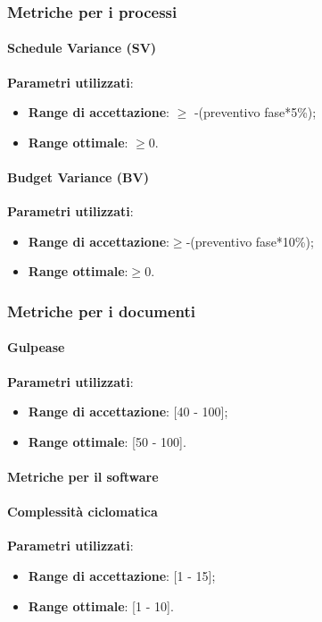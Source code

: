 \documentclass[12pt,a4paper,titlepage]{article}
\begin{document}
		\subsubsection{Metriche per i processi}
			\paragraph{Schedule Variance (SV)}
			\textbf{Parametri utilizzati}:
			\begin{itemize}
				\item \textbf{Range di accettazione}: $\geq$ -(preventivo fase*5\%);
				\item \textbf{Range ottimale}: $\geq0$.
			\end{itemize}
		
			\paragraph{Budget Variance (BV)}
			\textbf{Parametri utilizzati}:
			\begin{itemize}
				\item \textbf{Range di accettazione}:$\geq$-(preventivo fase*10\%);
				\item \textbf{Range ottimale}:$\geq0$.
			\end{itemize}
		
		\subsubsection{Metriche per i documenti}
			\paragraph{Gulpease}
			\textbf{Parametri utilizzati}:
			\begin{itemize}
				\item \textbf{Range di accettazione}: [40 - 100];
				\item \textbf{Range ottimale}: [50 - 100].
			\end{itemize}
		
			\paragraph{Metriche per il software}
			
			\paragraph{Complessità ciclomatica}
			\textbf{Parametri utilizzati}:
			\begin{itemize}
				\item \textbf{Range di accettazione}: [1 - 15];
				\item \textbf{Range ottimale}: [1 - 10].
			\end{itemize}
		
\end{document}
